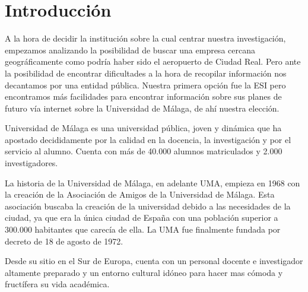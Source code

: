 \documentclass[11pt,a4paper,spanish,twoside]{book}
\begin{document}
\chapter*{Introducción}
A la hora de decidir la institución sobre la cual centrar nuestra 
investigación, empezamos analizando la posibilidad de buscar una empresa 
cercana geográficamente como podría haber sido el aeropuerto de Ciudad Real. 
Pero ante la posibilidad de encontrar dificultades a la hora de recopilar 
información nos decantamos por una entidad pública. Nuestra primera opción fue
la ESI pero encontramos más facilidades para encontrar información sobre sus 
planes de futuro vía internet sobre la Universidad de Málaga, de ahí nuestra 
elección.

Universidad de Málaga es una universidad pública, joven y dinámica que ha 
apostado decididamente por la calidad en la docencia, la investigación y por el
servicio al alumno. Cuenta con más de 40.000 alumnos matriculados y 2.000 
investigadores. 

La historia de la Universidad de Málaga, en adelante UMA, empieza en 1968 con 
la creación de la Asociación de Amigos de la Universidad de Málaga. Esta 
asociación buscaba la creación de la universidad debido a las necesidades de la 
ciudad, ya que era la única ciudad de España con una población superior a 
300.000 habitantes que carecía de ella. La UMA fue finalmente 
fundada por decreto de 18 de agosto de 1972.

Desde su sitio en el Sur de Europa, cuenta con un personal docente e 
investigador altamente preparado y un entorno cultural idóneo para hacer mas 
cómoda y fructífera su vida académica.
\end{document}
